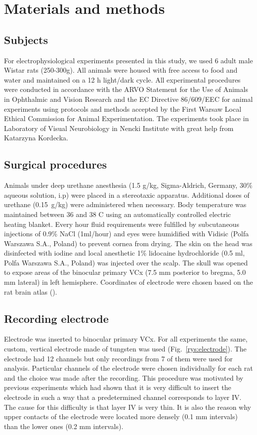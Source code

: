 \documentclass{pracalicmgr}
\begin{document}
   \chapter{Materials and methods}   
   \section{Subjects}
   For electrophysiological experiments presented in this study, we used 6 adult male Wistar rats (250-300g). All animals were housed with free access to food and water and maintained on a 12 h light/dark cycle. All experimental procedures  were conducted in accordance with the ARVO Statement for the Use of Animals in Ophthalmic and Vision Research and  the EC Directive 86/609/EEC for animal experiments using protocols and methods accepted by the First Warsaw Local Ethical Commission for Animal Experimentation. The experiments took place in Laboratory of Visual Neurobiology in Nencki Institute with great help from Katarzyna Kordecka.
   
   
   \section{Surgical procedures}
   Animals under deep urethane anesthesia (1.5 g/kg, Sigma-Aldrich, Germany, 30\% aqueous solution, i.p) were placed in a stereotaxic apparatus. Additional doses of urethane (0.15~g/kg) were administered when necessary. Body temperature was maintained between 36 and 38 \degree C using an automatically controlled electric heating blanket. Every hour fluid requirements were fulfilled by subcutaneous injections of 0.9\% NaCl (1ml/hour) and eyes were humidified with Vidisic (Polfa Warszawa S.A., Poland) to prevent cornea from drying. The skin on the head was disinfected with iodine and local anesthetic 1\% lidocaine hydrochloride (0.5 ml, Polfa Warszawa S.A., Poland) was injected over the scalp. The skull was opened to expose areas of the binocular primary VCx (7.5 mm posterior to bregma, 5.0 mm lateral) in left hemisphere. Coordinates of electrode were chosen based on the rat brain atlas (\cite{atlas}). 
   
   \section{Recording electrode}
   Electrode was inserted to binocular primary VCx. For all experiments the same, custom, vertical electrode made of tungsten was used (Fig.~\ref{rys:electrode}). The electrode had 12 channels but only recordings from 7 of them were used for analysis. Particular channels of the electrode were chosen individually for each rat and the choice was made after the recording. This procedure was motivated by previous experiments which had shown that it is very difficult to insert the electrode in such a way that a predetermined channel corresponds to layer IV. The cause for this difficulty is that layer IV is very thin. It is also the reason why upper contacts of the electrode were located more densely (0.1 mm intervals) than the lower ones (0.2 mm intervals).
   
\end{document}
